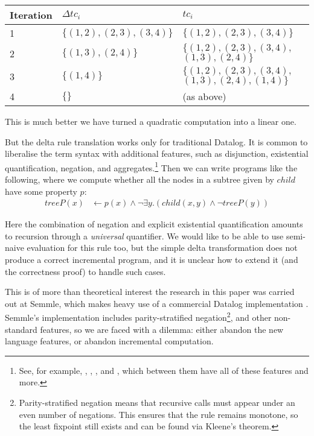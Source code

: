 \begin{center}
  \begin{tabular} {p{3.5em} p{8em} p{10em}}
    Iteration & $\Delta tc_i$ & $tc_i$ \\
    \toprule
    1 & $\{ (1, 2), (2, 3), (3, 4) \}$ & $\{ (1, 2), (2, 3), (3, 4) \}$\\
    2 & $\{ (1, 3), (2, 4) \}$ & $\{ (1, 2), (2, 3), (3, 4),$ $(1, 3), (2, 4) \}$\\
    3 & $\{ (1, 4) \}$ & $\{ (1, 2), (2, 3), (3, 4),$ $(1, 3), (2, 4), (1, 4) \}$\\
    4 & $\{ \}$ & (as above) \\
    \bottomrule
  \end{tabular}
\end{center}
\medskip

This is much better \textemdash we have turned a quadratic computation into a linear one.

But the delta rule translation works only for traditional Datalog. It is common to
liberalise the term syntax with additional features, such as disjunction,
existential quantification, negation, and aggregates.\footnote{ See, for
  example, \autocites(LogiQL)(){logicbloxWebsite}{halpin2014logiql},
  \autocites(Datomic)(){datomicWebsite},
  \autocites(Souffle)(){souffleWebsite}{scholz2016fast}, and
  \autocites(DES)(){saenz2011deductive}, which between them have all of these
  features and more. } 
Then we can write programs like the following, where we compute whether all the
nodes in a subtree given by $child$ have some property $p$:
\begin{align*}
  treeP(x) &\leftarrow p(x) \wedge \neg \exists y . (child(x,y) \wedge \neg treeP(y))
\end{align*}

Here the combination of negation and explicit existential quantification amounts
to recursion through a \emph{universal} quantifier. We would
like to be able to use semi-naive evaluation for this rule too, but the simple delta
transformation does not produce a correct incremental program, and it is unclear how to extend it (and the
correctness proof) to handle such cases.

This is of more than theoretical interest \textemdash the research
in this paper was carried out at Semmle, which
makes heavy use of a commercial Datalog implementation
\autocites{semmleWebsite}{avgustinov2016ql}{sereni2008adding}{schafer2010type}.
Semmle's implementation includes parity-stratified negation\footnote{Parity-stratified negation means that recursive calls must
  appear under an even number of negations. This ensures that the rule remains
  monotone, so the least fixpoint still exists and can be found via Kleene's theorem.}, and other non-standard
features, so we are faced with a dilemma: either abandon the new language
features, or abandon incremental computation.

